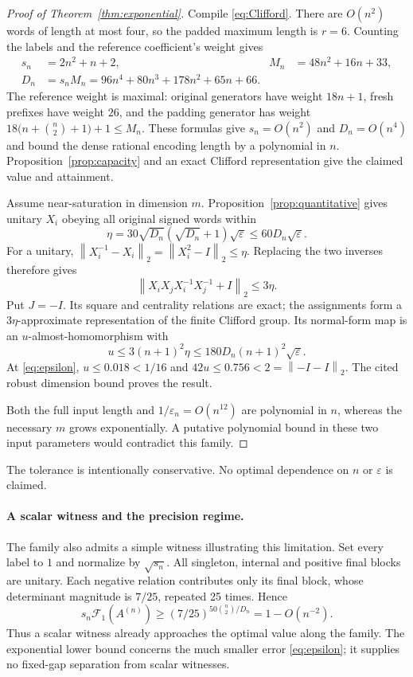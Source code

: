 \documentclass[11pt]{article}
\newcommand{\F}{\mathcal F}
\newcommand{\norm}[1]{\left\lVert#1\right\rVert}
\begin{document}
\begin{proof}[Proof of Theorem~\ref{thm:exponential}]
Compile \eqref{eq:Clifford}. There are $O(n^2)$ words of length at most four, so the padded maximum length is $r=6$. Counting the labels and the reference coefficient's weight gives
\begin{align*}
 s_n&=2n^2+n+2,& M_n&=48n^2+16n+33,\\
 D_n&=s_nM_n=96n^4+80n^3+178n^2+65n+66.
\end{align*}
The reference weight is maximal: original generators have weight $18n+1$, fresh prefixes have weight $26$, and the padding generator has weight $18\bigl(n+\binom n2+1\bigr)+1\le M_n$. These formulas give $s_n=O(n^2)$ and $D_n=O(n^4)$ and bound the dense rational encoding length by a polynomial in $n$. Proposition~\ref{prop:capacity} and an exact Clifford representation give the claimed value and attainment.

Assume near-saturation in dimension $m$. Proposition~\ref{prop:quantitative} gives unitary $X_i$ obeying all original signed words within
\[
 \eta=30\sqrt{D_n}(\sqrt{D_n}+1)\sqrt{\varepsilon}
 \le60D_n\sqrt{\varepsilon}.
\]
For a unitary, $\norm{X_i^{-1}-X_i}_2=\norm{X_i^2-I}_2\le\eta$. Replacing the two inverses therefore gives
\[
 \norm{X_iX_jX_i^{-1}X_j^{-1}+I}_2\le3\eta.
\]
Put $J=-I$. Its square and centrality relations are exact; the assignments form a $3\eta$-approximate representation of the finite Clifford group. Its normal-form map is an $u$-almost-homomorphism with
\[
 u\le3(n+1)^2\eta\le180D_n(n+1)^2\sqrt{\varepsilon}.
\]
At \eqref{eq:epsilon}, $u\le0.018<1/16$ and $42u\le0.756<2=\norm{-I-I}_2$. The cited robust dimension bound proves the result.

Both the full input length and $1/\varepsilon_n=O(n^{12})$ are polynomial in $n$, whereas the necessary $m$ grows exponentially. A putative polynomial bound in these two input parameters would contradict this family.
\end{proof}
The tolerance is intentionally conservative. No optimal dependence on $n$ or $\varepsilon$ is claimed.

\paragraph{A scalar witness and the precision regime.}
The family also admits a simple witness illustrating this limitation. Set every label to $1$ and normalize by $\sqrt{s_n}$. All singleton, internal and positive final blocks are unitary. Each negative relation contributes only its final block, whose determinant magnitude is $7/25$, repeated 25 times. Hence
\[
 s_n\F_1(A^{(n)})\ge
 (7/25)^{50\binom n2/D_n}=1-O(n^{-2}).
\]
Thus a scalar witness already approaches the optimal value along the family. The exponential lower bound concerns the much smaller error \eqref{eq:epsilon}; it supplies no fixed-gap separation from scalar witnesses.
\end{document}
